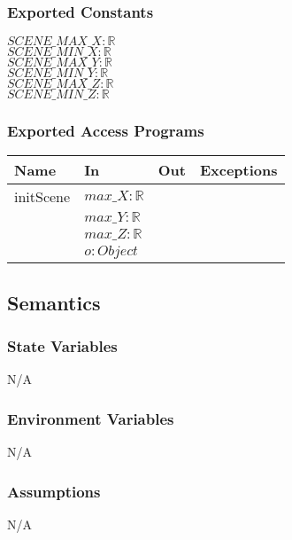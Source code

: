 \documentclass[12pt, titlepage]{article}
\begin{document}
\subsubsection{Exported Constants}
$SCENE\_MAX\_X : \mathbb{R}$\\
$SCENE\_MIN\_X : \mathbb{R}$\\
$SCENE\_MAX\_Y : \mathbb{R}$\\
$SCENE\_MIN\_Y : \mathbb{R}$\\
$SCENE\_MAX\_Z : \mathbb{R}$\\
$SCENE\_MIN\_Z : \mathbb{R}$\\
\subsubsection{Exported Access Programs}
\begin{center}
	\begin{tabular}{p{4cm} p{2cm} p{2cm} p{4cm}}
		\hline
		\textbf{Name} & \textbf{In} & \textbf{Out} & \textbf{Exceptions} \\
		\hline
		initScene & $max\_X : \mathbb{R}$ & & \\
		 & $max\_Y : \mathbb{R}$ & & \\		
		 & $max\_Z : \mathbb{R}$ & & \\				 
		 & $o : Object$ & & \\				 
		\hline
	\end{tabular}
\end{center}

\subsection{Semantics}
\subsubsection{State Variables}
N/A

\subsubsection{Environment Variables}
N/A

\subsubsection{Assumptions}
N/A
\end{document}
